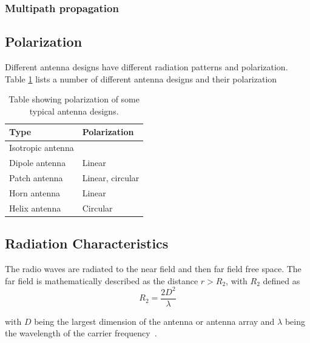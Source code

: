 \subsubsection{Multipath propagation}

\subsection{Polarization}
Different antenna designs have different radiation patterns and polarization. Table \ref{tab:antenna_types} lists a number of different antenna designs and their polarization
\begin{table}
    \centering
    \begin{tabular}[h]{l|l} 
        \textbf{Type} & \textbf{Polarization} \\
        \hline
        Isotropic antenna & \\
        Dipole antenna & Linear \\
        Patch antenna & Linear, circular \\
        Horn antenna & Linear \\
        Helix antenna & Circular \\
    \end{tabular}
    \caption{Table showing polarization of some typical antenna designs.}
    \label{tab:antenna_types}
\end{table}


\subsection{Radiation Characteristics}
The radio waves are radiated to the near field and then far field free space. The far field is mathematically described as the distance $r>R_2$, with $R_2$ defined as
\begin{equation} \label{eq:far_field}
    R_2 = \frac{2 D^2}{\lambda}
\end{equation}

with $D$ being the largest dimension of the antenna or antenna array and $\lambda$ being the wavelength of the carrier frequency~\cite[p. 4]{ant_beam_form}.

